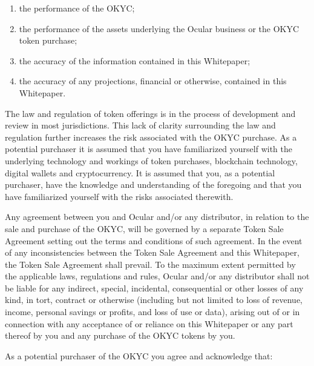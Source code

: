 \documentclass[12pt]{article}
\begin{document}
\begin{enumerate}
\item the performance of the OKYC;
\item the performance of the assets underlying the Ocular business or the OKYC token purchase;
\item the accuracy of the information contained in this Whitepaper;
\item the accuracy of any projections, financial or otherwise, contained in this Whitepaper.
\end{enumerate}

The law and regulation of token offerings is in the process of development and review in most jurisdictions. This lack of clarity surrounding the law and regulation further increases the risk associated with the OKYC purchase. As a potential purchaser it is assumed that you have familiarized yourself with the underlying technology and workings of token purchases, blockchain technology, digital wallets and cryptocurrency. It is assumed that you, as a potential purchaser, have the knowledge and understanding of the foregoing and that you have familiarized yourself with the risks associated therewith.

Any agreement between you and Ocular and/or any distributor, in relation to the sale and purchase of the OKYC, will be governed by a separate Token Sale Agreement setting out the terms and conditions of such agreement. In the event of any inconsistencies between the Token Sale Agreement and this Whitepaper, the Token Sale Agreement shall prevail. To the maximum extent permitted by the applicable laws, regulations and rules, Ocular and/or any distributor shall not be liable for any indirect, special, incidental, consequential or other losses of any kind, in tort, contract or otherwise (including but not limited to loss of revenue, income, personal savings or profits, and loss of use or data), arising out of or in connection with any acceptance of or reliance on this Whitepaper or any part thereof by you and any purchase of the OKYC tokens by you.

As a potential purchaser of the OKYC you agree and acknowledge that:
\end{document}
